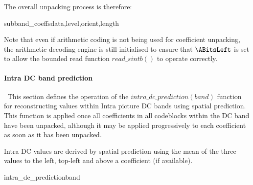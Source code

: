 \begin{figure}
[Include codeblock figure \label{codeblocks}]
\end{figure}

The overall unpacking process is therefore:

\begin{pseudo}{subband\_coeffs}{data,level,orient,length}
    \bsEND
\bsEND
{}
\end{pseudo}

\begin{informative}
Note that even if arithmetic coding is not being used for coefficient unpacking,
the arithmetic decoding engine is still initialised to ensure that $\ABitsLeft$ is set
to allow the bounded read function $read\_sintb()$ to operate correctly. 
\end{informative}

\paragraph{Intra DC band prediction}
\label{intradcprediction}
$\ $\newline
This section defines the operation of the $intra\_dc\_prediction(band)$ function
for reconstructing values within Intra picture DC bands using spatial prediction.
This function is applied once all coefficients in all codeblocks within the DC
band have been unpacked, although it may be applied progressively to each coefficient
as soon as it has been unpacked.

Intra DC values are derived by spatial prediction using the mean of the
three values to the left, top-left and above a coefficient (if available).

\begin{pseudo}{intra\_dc\_prediction}{band}
        \bsELSE
        \bsEND
    \bsELSE
        \bsELSE
        \bsEND
    \bsEND
  \bsEND
\bsEND
\end{pseudo}

